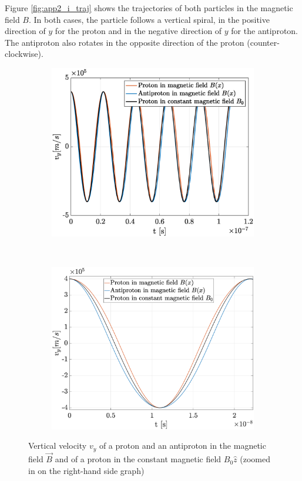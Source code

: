 \documentclass[a4paper,12pt,twoside]{article}
\begin{document}
Figure \ref{fig:app2_i_traj} shows the trajectories of both particles in the magnetic field $B$.
In both cases, the particle follows a vertical spiral, in the positive direction of $y$ for the proton and in the negative direction of $y$ for the antiproton. The antiproton also rotates in the opposite direction of the proton (counter-clockwise).

\begin{figure}[h]
\centering
\begin{subfigure}[t]{0.45\textwidth}
	\includegraphics[width=\textwidth]{graphs/app2_i_vyt.eps}
\end{subfigure}
~
\begin{subfigure}[t]{0.48\textwidth}
	\includegraphics[width=\textwidth]{graphs/vyzoom.eps}
\end{subfigure}
	\caption{Vertical velocity $v_y$ of a proton and an antiproton in the magnetic field $\vec{B}$ and of a proton in the constant magnetic field $B_0\hat{z}$ (zoomed in on the right-hand side graph)}
	\label{fig:app2_i_vyt}
\end{figure}
\end{document}
